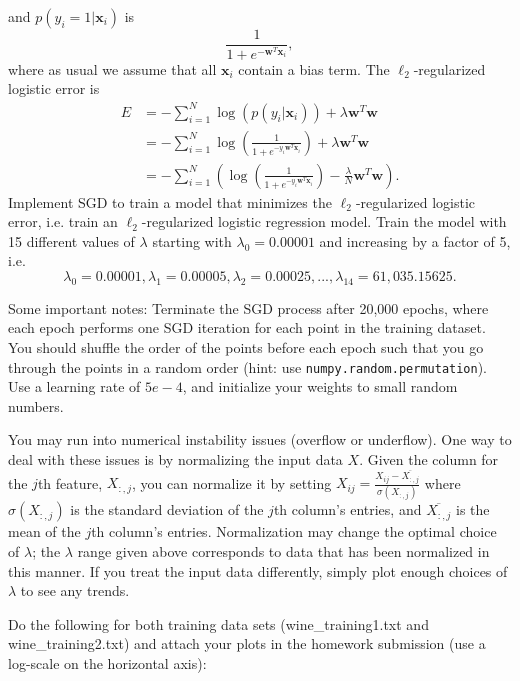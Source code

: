 and $p(y_i = 1 | \mathbf{x}_i)$ is
\[\frac{1}{1 + e^{-\mathbf{w}^T\mathbf{x}_i}},\]
where as usual we assume that all $\mathbf{x}_i$ contain a bias term.
The $\ell_2$-regularized logistic error is
\begin{align*}
  E &= -\sum_{i=1}^{N}\log(p(y_i | \mathbf{x}_i)) + \lambda\mathbf{w}^T\mathbf{w} \\
    &= -\sum_{i=1}^{N} \log \left( \frac{1}{1 + e^{-y_i\mathbf{w}^T\mathbf{x}_i}} \right) + \lambda\mathbf{w}^T\mathbf{w} \\
    &= -\sum_{i=1}^{N} \left(\log \left( \frac{1}{1 + e^{-y_i\mathbf{w}^T\mathbf{x}_i}} \right) - \frac{\lambda}{N}\mathbf{w}^T\mathbf{w}\right).
\end{align*}
Implement SGD to train a model that minimizes the $\ell_2$-regularized logistic error, i.e. train an $\ell_2$-regularized logistic regression model.  Train the model with 15 different values of $\lambda$ starting with $\lambda_0 = 0.00001$ and increasing by a factor of 5, i.e. $$\lambda_0 = 0.00001, \lambda_1 = 0.00005, \lambda_2 = 0.00025, ..., \lambda_{14} = 61,035.15625.$$
\par

Some important notes: Terminate the SGD process after 20,000 epochs, where each epoch performs one SGD iteration for each point in the training dataset. You should shuffle the order of the points before each epoch such that you go through the points in a random order (hint: use \texttt{numpy.random.permutation}). Use a learning rate of $5e-4$, and initialize your weights to small random numbers.

You may run into numerical instability issues (overflow or underflow). One way to deal with these issues is by normalizing the input data $X$. Given the column for the $j$th feature, $X_{:,j}$, you can normalize it by setting $X_{ij} = \frac{X_{ij} - \overline{X_{:,j}} }{\sigma(X_{:,j})}$ where $\sigma(X_{:,j})$ is the standard deviation of the $j$th column's entries, and $\overline{X_{:,j}}$ is the mean of the $j$th column's entries. Normalization may change the optimal choice of $\lambda$; the $\lambda$ range given above corresponds to data that has been normalized in this manner. If you treat the input data differently, simply plot enough choices of $\lambda$ to see any trends.

\problem[16]
Do the following for both training data sets (wine\_training1.txt and wine\_training2.txt) and attach your plots in the homework submission (use a log-scale on the horizontal axis):

